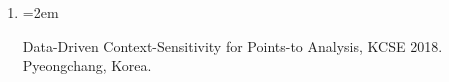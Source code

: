 \documentclass{scrartcl}
\newcommand{\MarginText}[1]{\marginpar{\raggedleft\itshape\small#1}} %
\newcommand{\Description}[1]{\hangindent=2em\hangafter=0\noindent\raggedright\footnotesize{#1}\par\normalsize\vspace{1em}} %
\begin{document}
\begin{cv}{}
\begin{enumerate}
\item{\Description{Data-Driven Context-Sensitivity for Points-to Analysis, KCSE 2018. Pyeongchang, Korea.}}

\end{enumerate}



















\end{cv}
\end{document}
